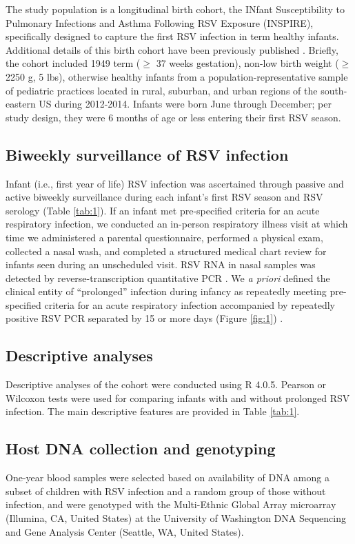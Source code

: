 \documentclass{article} %
\begin{document}
The study population is a longitudinal birth cohort, the INfant Susceptibility to Pulmonary Infections and Asthma Following RSV Exposure (INSPIRE), specifically designed to capture the first RSV infection in term healthy infants. Additional details of this birth cohort have been previously published 
\citep{larkin_objectives_2015}. Briefly, the cohort included 1949 term ($\ge$ 37 weeks gestation), non-low birth weight ($\ge$ 2250 g, 5 lbs), otherwise healthy infants from a population-representative sample of pediatric practices located in rural, suburban, and urban regions of the south-eastern US during 2012-2014. Infants were born June through December; per study design, they were 6 months of age or less entering their first RSV season.

\subsection{Biweekly surveillance of RSV infection}
Infant (i.e., first year of life) RSV infection was ascertained through passive and active biweekly surveillance during each infant’s first RSV season and RSV serology (Table \ref{tab:1}). 
If an infant met pre-specified criteria for an acute respiratory infection, we conducted an in-person respiratory illness visit at which time we administered a parental questionnaire, performed a physical exam, collected a nasal wash, and completed a structured medical chart review for infants seen during an unscheduled visit. RSV RNA in nasal samples was detected by reverse-transcription quantitative PCR 
\citep{larkin2015objectives}. We \textit{a priori} defined the clinical entity of “prolonged” infection during infancy as repeatedly meeting pre-specified criteria for an acute respiratory infection accompanied by repeatedly positive RSV PCR separated by 15 or more days (Figure \ref{fig:1}) 
\citep{okiro2010duration}.

\subsection{Descriptive analyses}
Descriptive analyses of the cohort were conducted using R 4.0.5. Pearson or Wilcoxon tests were used for comparing infants with and without prolonged RSV infection. The main descriptive features are provided in Table \ref{tab:1}.

\subsection{Host DNA collection and genotyping}
One-year blood samples were selected based on availability of DNA among a subset of children with RSV infection and a random group of those without infection, and were genotyped with the Multi-Ethnic Global Array microarray (Illumina, CA, United States) at the University of Washington DNA Sequencing and Gene Analysis Center (Seattle, WA, United States).
\end{document}
